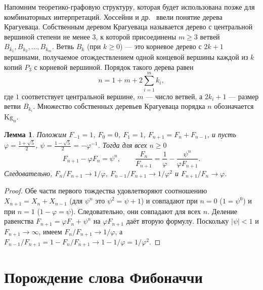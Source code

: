 \documentclass[a4paper,14pt]{extreport}
\theoremstyle{plain}
\newtheorem{lemma}{Лемма}[section]
\theoremstyle{definition}
\theoremstyle{remark}
\begin{document}
Напомним теоретико-графовую структуру, которая будет использована позже для комбинаторных интерпретаций. Хоссейни и др.~\cite{HosseiniGutmanAhmadi} ввели понятие дерева Крагуеваца. Собственным деревом Крагуеваца называется дерево с центральной вершиной степени не менее $3$, к которой присоединены $m \ge 3$ ветвей $B_{k_1},B_{k_2},\dots,B_{k_m}$. Ветвь $B_k$ (при $k \ge 0$) --- это корневое дерево с $2k+1$ вершинами, получаемое отождествлением одной концевой вершины каждой из $k$ копий $P_3$ с корневой вершиной. Порядок такого дерева равен
\begin{equation}
	n = 1 + m + 2 \sum_{i=1}^m k_i,
\end{equation}
где $1$ соответствует центральной вершине, $m$ --- число ветвей, а $2k_i+1$ --- размер ветви $B_{k_i}$. Множество собственных деревьев Крагуеваца порядка $n$ обозначается $\mathrm{Kg}_n$.

\begin{lemma}\label{lem:fibA}
	Положим $F_{-1}=1$, $F_0=0$, $F_1=1$, $F_{n+1}=F_n+F_{n-1}$, и пусть
	$\varphi=\frac{1+\sqrt5}{2}$, $\psi=\frac{1-\sqrt5}{2}=-\varphi^{-1}$.
	Тогда для всех $n\ge 0$
	\begin{equation}
		F_{n+1}-\varphi F_n=\psi^{n},\qquad
		\frac{F_n}{F_{n+1}}=\frac1\varphi-\frac{\psi^{n}}{\varphi F_{n+1}} .
	\end{equation}
	Следовательно, $F_n/F_{n+1}\to 1/\varphi$, $F_{n-1}/F_{n+1}\to 1/\varphi^{2}$ и
	$F_{n+1}/F_n\to\varphi$.
\end{lemma}
\begin{proof}
	Обе части первого тождества удовлетворяют соотношению $X_{n+1}=X_n+X_{n-1}$ (для $\psi^n$ это $\psi^2=\psi+1$)
	и совпадают при $n=0$ ($1=\psi^0$) и при $n=1$ ($1-\varphi=\psi$). Следовательно, они совпадают для всех $n$.
	Деление равенства $F_{n+1}=\varphi F_n+\psi^n$ на $\varphi F_{n+1}$ даёт вторую формулу.
	Поскольку $|\psi|<1$ и $F_{n+1}\to\infty$, имеем $F_n/F_{n+1}\to1/\varphi$, а
	$F_{n-1}/F_{n+1}=1-F_n/F_{n+1}\to 1-1/\varphi=1/\varphi^{2}$.
\end{proof}
\section{Порождение слова Фибоначчи}~\label{sec3.2}
\end{document}
